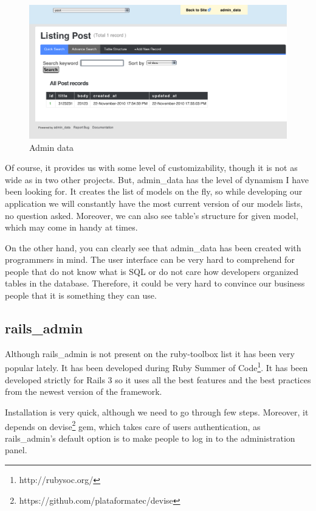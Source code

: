     \begin{figure}[hbt!]
  		\begin{center}
  			\includegraphics[width=\linewidth]{images/chapter01/admindata1.png}
  			\caption{Admin data}
  			\label{admindata1}
  		\end{center}
  	\end{figure}
  
  Of course, it provides us with some level of customizability, though it is not as wide as in two other projects. But, admin\_data has the level of dynamism I have been looking for. It creates the list of models on the fly, so while developing our application we will constantly have the most current version of our models lists, no question asked. Moreover, we can also see table's structure for given model, which may come in handy at times.
  
  On the other hand, you can clearly see that admin\_data has been created with programmers in mind. The user interface can be very hard to comprehend for people that do not know what is SQL or do not care how developers organized tables in the database. Therefore, it could be very hard to convince our business people that it is something they can use.
  
  \subsection{rails\_admin}
  Although rails\_admin is not present on the ruby-toolbox list it has been very popular lately. It has been developed during Ruby Summer of Code\footnote{http://rubysoc.org/}. It has been developed strictly for Rails 3 so it uses all the best features and the best practices from the newest version of the framework.
  
  Installation is very quick, although we need to go through few steps. Moreover, it depends on devise\footnote{https://github.com/plataformatec/devise} gem, which takes care of users authentication, as rails\_admin's default option is to make people to log in to the administration panel.
  
